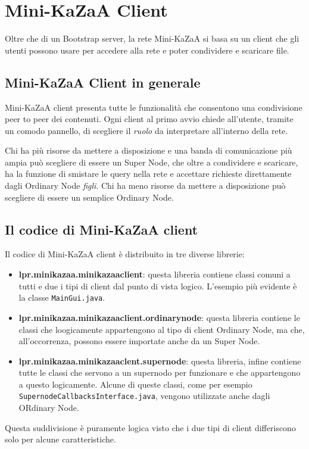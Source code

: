\chapter{Mini-KaZaA Client}
Oltre che di un Bootstrap server, la rete Mini-KaZaA si basa su un client che gli utenti possono usare per accedere alla rete e poter condividere e scaricare file.
\section{Mini-KaZaA Client in generale}
Mini-KaZaA client presenta tutte le funzionalità che consentono una condivisione peer to peer dei contenuti.
Ogni client al primo avvio chiede all'utente, tramite un comodo pannello, di scegliere il \emph{ruolo} da interpretare all'interno della rete.

Chi ha più risorse da mettere a disposizione e una banda di comunicazione più ampia può scegliere di essere un Super Node, che oltre a condividere e scaricare, ha la funzione di smistare le query nella rete e accettare richieste direttamente dagli Ordinary Node \emph{figli}. Chi ha meno risorse da mettere a disposizione può scegliere di essere un semplice Ordinary Node.

\section{Il codice di Mini-KaZaA client}
Il codice di Mini-KaZaA client è distribuito in tre diverse librerie:
\begin{itemize}
 \item \textbf{lpr.minikazaa.minikazaaclient}: questa libreria contiene classi comuni a tutti e due i tipi di client dal punto di vista logico. L'esempio più evidente è la classe \verb|MainGui.java|.
 \item \textbf{lpr.minikazaa.minikazaaclient.ordinarynode}: questa libreria contiene le classi che loogicamente appartengono al tipo di client Ordinary Node, ma che, all'occorrenza, possono essere importate anche da un Super Node.
 \item \textbf{lpr.minikazaa.minikazaaclent.supernode}: questa libreria, infine contiene tutte le classi che servono a un supernodo per funzionare e che appartengono a questo logicamente. Alcune di queste classi, come per esempio \verb|SupernodeCallbacksInterface.java|, vengono utilizzate anche dagli ORdinary Node.
\end{itemize}

Questa suddivisione è puramente logica visto che i due tipi di client differiscono solo per alcune caratteristiche.

